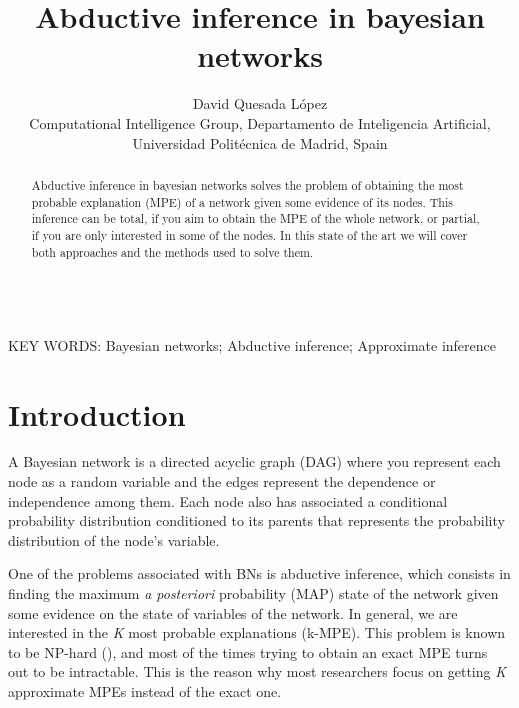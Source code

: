 \documentclass[a4paper,11pt]{article}
\begin{document}
\title{Abductive inference in bayesian networks}

\author{{David Quesada López}\\
{\small Computational Intelligence Group, Departamento de Inteligencia Artificial, Universidad Polit\'ecnica de Madrid, Spain}}

\date{}
\maketitle



\begin{abstract} Abductive inference in bayesian networks solves the problem of obtaining the most probable explanation (MPE) of a network given some evidence of its nodes. This inference can be total, if you aim to obtain the MPE of the whole network, or partial, if you are only interested in some of the nodes. In this state of the art we will cover both approaches and the methods used to solve them.
\end{abstract}


\ \\
KEY WORDS: Bayesian networks; Abductive inference; Approximate inference


\section{Introduction}

A Bayesian network is a directed acyclic graph (DAG) where you represent each node as a random variable and the edges represent the dependence or independence among them. Each node also has associated a conditional probability distribution conditioned to its parents that represents the probability distribution of the node's variable.

One of the problems associated with BNs is abductive inference, which consists in finding the maximum \textit{a posteriori} probability (MAP) state of the network given some evidence on the state of variables of the network. In general, we are interested in the \textit{K} most probable explanations (k-MPE). This problem is known to be NP-hard (\cite{shimony1994}), and most of the times trying to obtain an exact MPE turns out to be intractable. This is the reason why most researchers focus on getting \textit{K} approximate MPEs instead of the exact one. 

\end{document}

